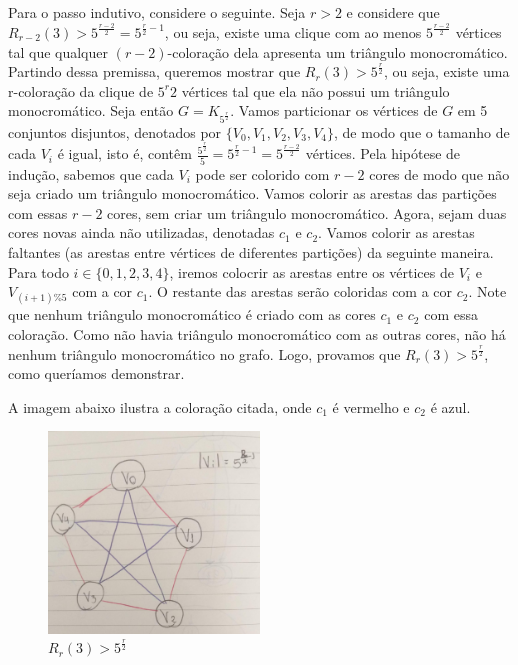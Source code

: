 \documentclass{article}
\begin{document}
\begin{itemize}
	      Para o passo indutivo, considere o seguinte. Seja \(r > 2\) e considere que \(R_{r-2}(3) > 5^{\frac{r-2}{2}} = 5^{\frac{r}{2}-1}\), ou seja, existe uma clique com ao menos \(5^{\frac{r-2}{2}}\) vértices tal que qualquer \((r - 2)\)-coloração dela apresenta
	      um triângulo monocromático. Partindo dessa premissa, queremos mostrar que \(R_r(3) > 5^{\frac{r}{2}}\), ou seja, existe uma r-coloração da clique de \(5^{r}{2}\) vértices tal que ela não possui um triângulo monocromático. Seja então \(G = K_{5^{\frac{r}{2}}}\).
	      Vamos particionar os vértices de \(G\) em 5 conjuntos disjuntos, denotados por \(\{V_0, V_1, V_2, V_3, V_4\}\), de modo que o tamanho de cada \(V_i\) é igual, isto é, contêm \(\frac{5^{\frac{r}{2}}}{5} = 5^{\frac{r}{2} - 1} = 5^{\frac{r - 2}{2}}\) vértices. Pela hipótese
	      de indução, sabemos que cada \(V_i\) pode ser colorido com \(r-2\) cores de modo que não seja criado um triângulo monocromático. Vamos colorir as arestas das partições com essas \(r-2\) cores, sem criar um triângulo monocromático. Agora, sejam duas cores novas ainda não utilizadas,
	      denotadas \(c_1\) e \(c_2\). Vamos colorir as arestas faltantes (as arestas entre vértices de diferentes partições) da seguinte maneira. Para todo \(i \in \{0, 1, 2, 3, 4\}\), iremos colocrir as arestas entre os vértices de \(V_i\) e \(V_{(i+1) \% 5}\) com a cor \(c_1\). O restante das arestas serão coloridas
	      com a cor \(c_2\). Note que nenhum triângulo monocromático é criado com as cores \(c_1\) e \(c_2\) com essa coloração. Como não havia triângulo monocromático com as outras cores, não há nenhum triângulo monocromático no grafo. Logo, provamos que \(R_r(3) > 5^{\frac{r}{2}}\), como queríamos demonstrar.

	      A imagem abaixo ilustra a coloração citada, onde \(c_1\) é vermelho e \(c_2\) é azul.

	      \begin{figure}[H]
		      \centering
		      \includegraphics[width=0.5\textwidth]{images/k5coloring.jpeg}
		      \caption{\(R_r(3) > 5^{\frac{r}{2}}\)}
	      \end{figure}


\end{itemize}
\end{document}
